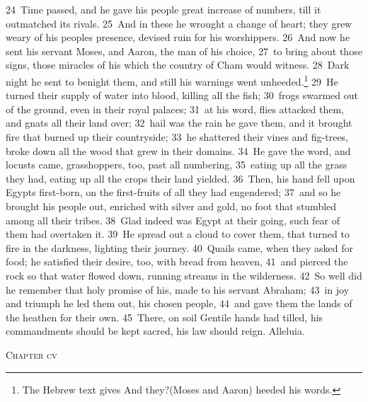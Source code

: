 \documentclass[10pt]{book} %
\begin{document}
\textcolor{benred8}{24}~Time passed, and he gave his people great increase of numbers, till it outmatched its rivals. \textcolor{benred8}{25}~And in these he wrought a change of heart; they grew weary of his people\textquotesingle s presence, devised ruin for his worshippers. \textcolor{benred8}{26}~And now he sent his servant Moses, and Aaron, the man of his choice, \textcolor{benred8}{27}~to bring about those signs, those miracles of his which the country of Cham would witness. \textcolor{benred8}{28}~Dark night he sent to benight them, and still his warnings went unheeded.\footnote[3]{The Hebrew text gives \textasciigrave And they?(Moses and Aaron) heeded his words\textquotesingle .} \textcolor{benred8}{29}~He turned their supply of water into blood, killing all the fish; \textcolor{benred8}{30}~frogs swarmed out of the ground, even in their royal palaces; \textcolor{benred8}{31}~at his word, flies attacked them, and gnats all their land over; \textcolor{benred8}{32}~hail was the rain he gave them, and it brought fire that burned up their countryside; \textcolor{benred8}{33}~he shattered their vines and fig-trees, broke down all the wood that grew in their domains. \textcolor{benred8}{34}~He gave the word, and locusts came, grasshoppers, too, past all numbering, \textcolor{benred8}{35}~eating up all the grass they had, eating up all the crops their land yielded. \textcolor{benred8}{36}~Then, his hand fell upon Egypt\textquotesingle s first-born, on the first-fruits of all they had engendered; \textcolor{benred8}{37}~and so he brought his people out, enriched with silver and gold, no foot that stumbled among all their tribes.
\textcolor{benred8}{38}~Glad indeed was Egypt at their going, such fear of them had overtaken it. \textcolor{benred8}{39}~He spread out a cloud to cover them, that turned to fire in the darkness, lighting their journey. \textcolor{benred8}{40}~Quails came, when they asked for food; he satisfied their desire, too, with bread from heaven, \textcolor{benred8}{41}~and pierced the rock so that water flowed down, running streams in the wilderness. \textcolor{benred8}{42}~So well did he remember that holy promise of his, made to his servant Abraham; \textcolor{benred8}{43}~in joy and triumph he led them out, his chosen people, \textcolor{benred8}{44}~and gave them the lands of the heathen for their own. \textcolor{benred8}{45}~There, on soil Gentile hands had tilled, his commandments should be kept sacred, his law should reign. Alleluia.
\begin{large}\begin{center}\textsc{Chapter cv}\end{center}\end{large}
\end{document}
